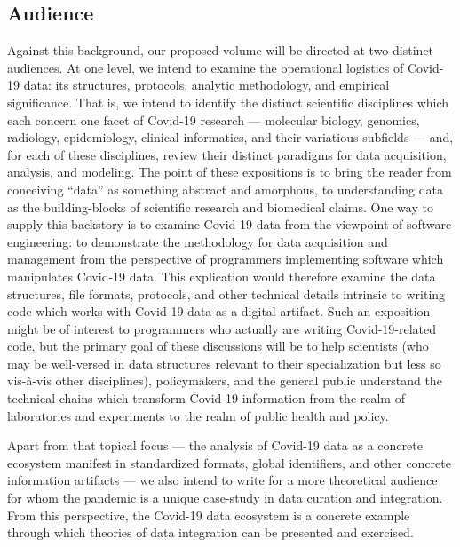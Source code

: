 \documentclass{statsoc}
\newcommand{\p}[1]{

\vspace{.75em}#1}
\newcommand{\textscc}[1]{{\color{orr!35!black}{{%
						\fontfamily{Cabin-TLF}\fontseries{b}\selectfont{\textsc{\scriptsize{#1}}}}}}}
\newcommand{\AcronymText}[1]{{\textscc{#1}}}
\newcommand{\q}[1]{{\fontfamily{qcr}\selectfont ``}#1{\fontfamily{qcr}\selectfont ''}}
\newcommand{\API}{\resizebox{!}{7pt}{\AcronymText{API}}}
\newcommand{\visavis}{vis-\`a-vis}
\begin{document}
{\subsection{Audience}
\p{Against this background, our proposed volume 
will be directed at two distinct audiences.  
At one level, we intend to examine the 
operational logistics of Covid-19 data: its 
structures, protocols, analytic methodology, 
and empirical significance.  That is, we 
intend to identify the distinct scientific 
disciplines which each concern one facet 
of Covid-19 research --- molecular biology, 
genomics, radiology, epidemiology, clinical 
informatics, and their variatious subfields 
--- and, for each of these disciplines, 
review their distinct paradigms for 
data acquisition, analysis, and modeling.  
The point of these expositions is to bring 
the reader from conceiving \q{data} as something 
abstract and amorphous, to understanding 
data as the building-blocks of scientific 
research and biomedical claims.  One way to supply this backstory 
is to examine Covid-19 data from the viewpoint 
of software engineering: to demonstrate 
the methodology for data acquisition and 
management from the perspective of programmers 
implementing software which manipulates Covid-19 data.  
This explication would therefore examine the 
data structures, file formats, \API{} protocols, 
and other technical details intrinsic to writing 
code which works with Covid-19 data as a 
digital artifact.  Such an exposition might be 
of interest to programmers who actually are 
writing Covid-19-related code, but the primary 
goal of these discussions will be to help 
scientists (who may be well-versed in data 
structures relevant to their specialization 
but less so \visavis{} other disciplines), 
policymakers, and the general public understand 
the technical chains which transform 
Covid-19 information from the realm of 
laboratories and experiments to the realm of 
public health and policy.}

\p{Apart from that topical focus --- the analysis 
of Covid-19 data as a concrete ecosystem 
manifest in standardized formats, global 
identifiers, and other concrete information 
artifacts --- we also intend to write for a 
more theoretical audience for whom the 
pandemic is a unique case-study in data 
curation and integration.  From this perspective, 
the Covid-19 data ecosystem is a concrete example 
through which theories of data integration can 
be presented and exercised.}

}
\end{document}
